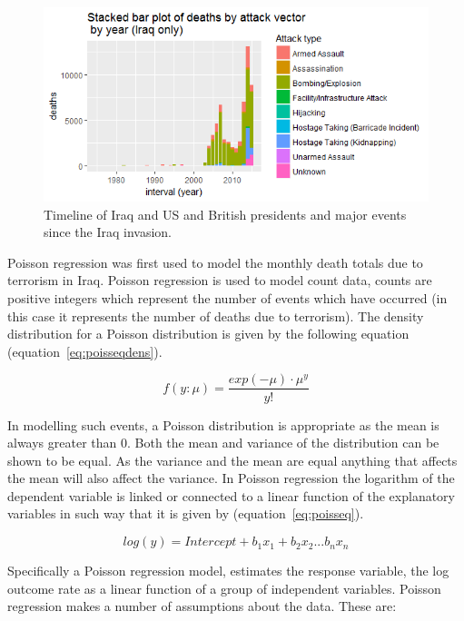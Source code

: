 \begin{figure}[t]
\includegraphics[width=15cm]{Peters_experiment_markdown_files/figure-latex/Rplot01IraqDeaths.png}
\caption{Timeline of Iraq  and US and British presidents and major events since the Iraq invasion.}
\label{fig:deathsiniraq}
\centering
\end{figure}

Poisson regression was first used to model the monthly death totals due to terrorism in Iraq. Poisson regression is used to model count data, counts are positive integers which represent the number of events which have occurred (in this case it represents the number of deaths due to terrorism). The density distribution for a Poisson distribution is given by the following equation (equation~\ref{eq:poisseqdens}).

\begin{equation} f(y:\mu)= \frac{exp(-\mu)\cdot \mu^y}{y!}  \label{eq:poisseqdens}  \end{equation}

In modelling such events, a Poisson distribution is appropriate as the mean is always greater than 0. Both the mean and variance of the distribution can be shown to be equal. As the variance and the mean are equal anything that affects the mean will also affect the variance. In Poisson regression the logarithm of the dependent variable is linked or connected to a linear function of the explanatory variables in such way that it is given by (equation~\ref{eq:poisseq}).

\begin{equation} log(y)=Intercept+b_1x_1+b_2x_2...b_nx_n   \label{eq:poisseq}  \end{equation}

Specifically a Poisson regression model, estimates the response variable, the log outcome rate as a linear function of a group of independent variables. Poisson regression makes a number of assumptions about the data. These are:

